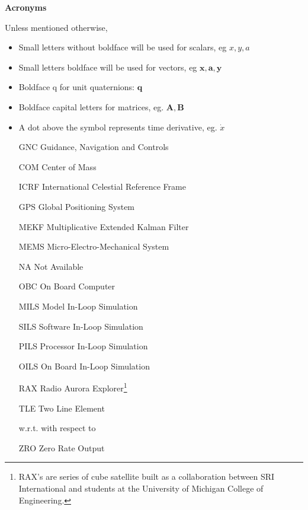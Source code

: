 \documentclass[../../main.tex]{subfiles}
\begin{document}
\newpage
\thispagestyle{plain}
\begin{center}
    \Large{\textbf{Acronyms}}
\end{center}


Unless mentioned otherwise,
\begin{itemize}
    \item Small letters without boldface will be used for scalars, eg $x,y,a$
    \item Small letters boldface will be used for vectors, eg $\bm{x},\bm{a},\bm{y}$
    \item Boldface q for unit quaternions: $\bm{q}$
    \item Boldface capital letters for matrices, eg. $\bm{A},\bm{B}$
    \item A dot above the symbol represents time derivative, eg. $\dot{x}$
    \end{itemize}
    
    
\begin{itemize}[label={}]
\item [GNC] Guidance, Navigation and Controls
\item [COM] Center of Mass
\item [ICRF] International Celestial Reference Frame
\item[GPS] Global Positioning System 
\item[MEKF] Multiplicative Extended Kalman Filter
\item[MEMS] Micro-Electro-Mechanical System
\item[NA] Not Available
\item [OBC] On Board Computer
\item [MILS] Model In-Loop Simulation
\item [SILS] Software In-Loop Simulation
\item [PILS] Processor In-Loop Simulation
\item [OILS] On Board In-Loop Simulation
\item[RAX] Radio Aurora Explorer\footnote{RAX's are series of cube satellite built as a collaboration between SRI International and students at the University of Michigan College of Engineering.}
\item [TLE] Two Line Element
\item [w.r.t.] with respect to
\item[ZRO] Zero Rate Output

\end{itemize}
\end{document}
